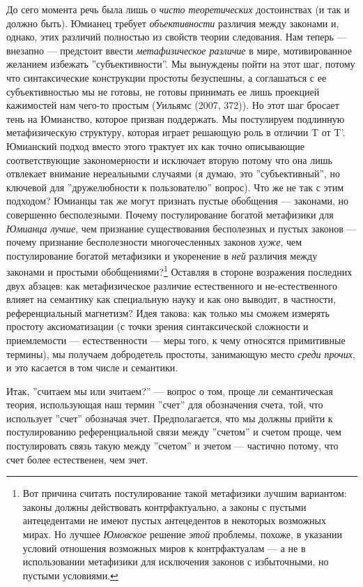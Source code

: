 \documentclass[11pt]{book}
\begin{document}
До сего момента речь была лишь о \textit{чисто теоретических} достоинствах (и так и должно быть). Юмианец требует \textit{объективности} различия между законами и, однако, этих различий полностью из свойств теории следования. Нам теперь --- внезапно --- предстоит ввести \textit{метафизическое различие} в мире, мотивированное желанием избежать ''субъективности''. Мы вынуждены пойти на этот шаг, потому что синтаксические конструкции простоты безуспешны, а соглашаться с ее субъективностью мы не готовы, не готовы принимать ее лишь проекцией кажимостей нам чего-то простым (Уильямс (2007, 372)). Но этот шаг бросает тень на Юмианство, которое призван поддержать. Мы постулируем подлинную метафизическую структуру, которая играет решающую роль в отличии T от T'. Юмианский подход вместо этого трактует их как точно описывающие соответствующие закономерности и исключает вторую потому что она лишь отвлекает внимание нереальными случаями (я думаю, это ''субъективный'', но ключевой для ''дружелюбности к пользователю'' вопрос). Что же не так с этим подходом? Юмианцы так же могут признать пустые обобщения --- законами, но совершенно бесполезными. Почему постулирование богатой метафизики для \textit{Юмианца лучше}, чем признание существования бесполезных и пустых законов --- почему признание бесполезности многочесленных законов \textit{хуже}, чем постулирование богатой метафизики и укоренение в \textit{ней} различия между законами и простыми обобщениями?\footnote{Вот причина считать постулирование такой метафизики лучшим вариантом: законы должны действовать контрфактуально, а законы с пустыми антецедентами не имеют пустых антецедентов в некоторых возможных мирах. Но лучшее \textit{Юмовское} решение \textit{этой} проблемы, похоже, в указании условий отношения возможных миров к контрфактуалам --- а не в использовании метафизики для исключения законов с избыточными, но пустыми условиями.} Оставляя в стороне возражения последних двух абзацев: как метафизическое различие естественного и не-естественного влияет на семантику как специальную науку и как оно выводит, в частности, референциальный магнетизм? Идея такова: как только мы сможем измерять простоту аксиоматизации (с точки зрения синтаксической сложности и приемлемости --- естественности --- меры того, к чему относятся примитивные термины), мы получаем добродетель простоты, занимающую место \textit{среди прочих}, и это касается в том числе и семантики.

Итак, ''считаем мы или зчитаем?'' --- вопрос о том, проще ли семантическая теория, использующая наш термин ''счет'' для обозначения счета, той, что использует ''счет'' обозначая зчет. Предполагается, что мы должны прийти к постулированию референциальной связи между ''счетом'' и счетом проще, чем постулировать связь такую между ''счетом'' и зчетом --- частично потому, что счет более естественен, чем зчет.
\end{document}
